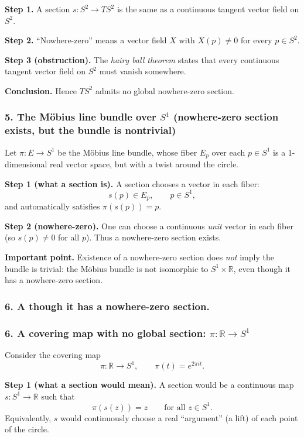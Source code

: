 \documentclass[12pt,a4paper]{article}
\theoremstyle{notespace}
\begin{document}
\textbf{Step 1.} A section $s:S^2\to TS^2$ is the same as a continuous tangent vector field on $S^2$.

\textbf{Step 2.} ``Nowhere-zero'' means a vector field $X$ with $X(p)\neq 0$ for every $p\in S^2$.

\textbf{Step 3 (obstruction).} The \emph{hairy ball theorem} states that every continuous tangent vector field on $S^2$ must vanish somewhere.

\textbf{Conclusion.} Hence $TS^2$ admits no global nowhere-zero section.

\subsubsection{5. The M\"obius line bundle over $S^1$ (nowhere-zero section exists, but the bundle is nontrivial)}

Let $\pi:E\to S^1$ be the M\"obius line bundle, whose fiber $E_p$ over each $p\in S^1$ is a $1$-dimensional real vector space, but with a twist around the circle.

\textbf{Step 1 (what a section is).} A section chooses a vector in each fiber:
\[
s(p)\in E_p,\qquad p\in S^1,
\]
and automatically satisfies $\pi(s(p))=p$.

\textbf{Step 2 (nowhere-zero).} One can choose a continuous \emph{unit} vector in each fiber (so $s(p)\neq 0$ for all $p$). Thus a nowhere-zero section exists.

\textbf{Important point.} Existence of a nowhere-zero section does \emph{not} imply the bundle is trivial:
the M\"obius bundle is not isomorphic to $S^1\times \mathbb{R}$, even though it has a nowhere-zero section.

\subsubsection{6. A though it has a nowhere-zero section.}
	
	\subsubsection{6. A covering map with no global section: $\pi:\mathbb{R}\to S^1$}
	
	Consider the covering map
	\[
	\pi:\mathbb{R}\to S^1,\qquad \pi(t)=e^{2\pi i t}.
	\]
	
	\textbf{Step 1 (what a section would mean).} A section would be a continuous map $s:S^1\to \mathbb{R}$ such that
	\[
	\pi(s(z))=z \qquad \text{for all } z\in S^1.
	\]
	Equivalently, $s$ would continuously choose a real ``argument'' (a lift) of each point of the circle.
	
\end{document}
